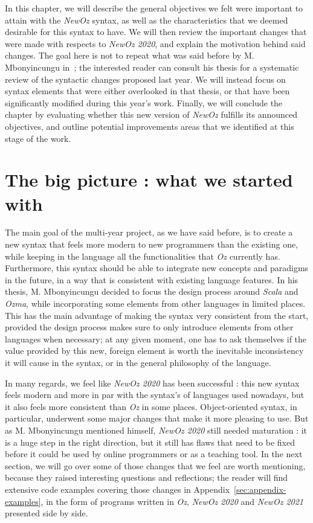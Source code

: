In this chapter, we will describe the general objectives we felt were important to attain with the \textit{NewOz} syntax, as well as the characteristics that we deemed desirable for this syntax to have.
We will then review the important changes that were made  with respects to \textit{NewOz 2020}, and explain the motivation behind said changes.
The goal here is not to repeat what was said before by M. Mbonyincungu in~\cite{jpthesis};
the interested reader can consult his thesis for a systematic review of the syntactic changes proposed last year.
We will instead focus on syntax elements that were either overlooked in that thesis, or that have been significantly modified during this year's work.
Finally, we will conclude the chapter by evaluating whether this new version of \textit{NewOz} fulfills its announced objectives, and outline potential improvements areas that we identified at this stage of the work.\newline

\section{The big picture : what we started with}\label{sec:ch2-goal}
The main goal of the multi-year project, as we have said before, is to create a new syntax that feels more modern to new programmers than the existing one, while keeping in the language all the functionalities that \textit{Oz} currently has.
Furthermore, this syntax should be able to integrate new concepts and paradigms in the future, in a way that is consistent with existing language features.
In his thesis, M. Mbonyincungu decided to focus the design process around \textit{Scala} and \textit{Ozma}, while incorporating some elements from other languages in limited places.
This has the main advantage of making the syntax very consistent from the start, provided the design process makes sure to only introduce elements from other languages when necessary;
at any given moment, one has to ask themselves if the value provided by this new, foreign element is worth the inevitable inconsistency it will cause in the syntax, or in the general philosophy of the language.\newline

In many regards, we feel like \textit{NewOz 2020} has been successful : this new syntax feels modern and more in par with the syntax's of languages used nowadays, but it also feels more consistent than \textit{Oz} in some places.
Object-oriented syntax, in particular, underwent some major changes that make it more pleasing to use.
But as M. Mbonyincungu mentioned himself, \textit{NewOz 2020} still needed maturation : it is a huge step in the right direction, but it still has flaws that need to be fixed before it could be used by online programmers or as a teaching tool.
In the next section, we will go over some of those changes that we feel are worth mentioning, because they raised interesting questions and reflections;
the reader will find extensive code examples covering those changes in Appendix~\ref{sec:appendix-examples}, in the form of programs written in \textit{Oz}, \textit{NewOz 2020} and \textit{NewOz 2021} presented side by side.

